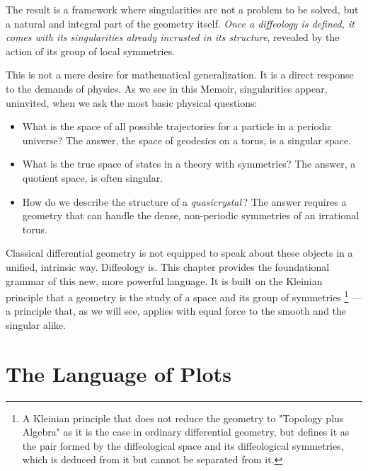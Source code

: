   The result is a framework where singularities are not a problem to be solved,
  but a natural and integral part of the geometry itself.
  \emph{Once a diffeology is defined,
  it comes with its singularities already incrusted in its structure},
  revealed by the action of its group of local symmetries.
  
  This is not a mere desire for mathematical generalization.
  It is a direct response to the demands of physics.
  As we see in this Memoir,
  singularities appear,
  uninvited,
  when we ask the most basic physical questions:
  
  \begin{itemize}
    \item What is the space of all possible trajectories for a particle in a periodic universe?
    The answer,
    the space of geodesics on a torus,
    is a singular space.
    \item What is the true space of states in a theory with symmetries?
    The answer,
    a quotient space,
    is often singular.
    \item How do we describe the structure of a \emph{quasicrystal}\,?
    The answer requires a geometry that can handle the dense,
    non-periodic symmetries of an irrational torus.
  \end{itemize}
  
  Classical differential geometry is not equipped to speak about these objects in a unified,
  intrinsic way.
  Diffeology is.
  This chapter provides the foundational grammar of this new,
  more powerful language.
  It is built on the Kleinian principle that a geometry is the study of a space and its group of symmetries%
  \footnote{A Kleinian principle that does not reduce the geometry to "Topology plus Algebra" as it is the case in ordinary differential geometry,
  but defines it as the pair formed by the diffeological space and its diffeological symmetries,
  which is deduced from it but cannot be separated from it.}
  ---a principle that,
  as we will see,
  applies with equal force to the smooth and the singular alike.
  
  \section{The Language of Plots}
  \label{sec:The Language of Plots}
  
